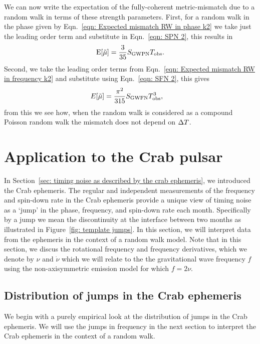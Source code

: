 \documentclass[../full_thesis/full_thesis.tex]{subfiles}
\begin{document}
{We can now write the expectation of the fully-coherent metric-mismatch due to
a random walk in terms of these strength parameters. First, for a random walk
in the phase given by Eqn.~\eqref{eqn: Expected mismatch RW in phase k2} we
take just the leading order term and substitute in Eqn.~\eqref{eqn: SPN 2},
this results in
\begin{align}
\textrm{E}[\tilde{\mu}] = \frac{3}{35} S_{\textrm{GWPN}} T_{\mathrm{obs}}.
\label{eqn: mu prediction phase}
\end{align}
Second, we take the leading order terms from Eqn.~\eqref{eqn: Expected mismatch RW in
frequency k2} and substitute using Eqn.~\eqref{eqn: SFN 2}, this gives
\begin{align}
E[\tilde{\mu}] & = \frac{\pi^{2}}{315} S_{\textrm{GWFN}} T_{\mathrm{obs}}^{3},
\label{eqn: mu prediction}
\end{align}
from this we see how, when the random walk is considered as a compound Poisson
random walk the mismatch does not depend on $\Delta T$.

\section{Application to the Crab pulsar}
\label{sec: application to the crab}
In Section~\ref{sec: timing noise as described by the crab ephemeris}, we
introduced the Crab ephemeris.  The regular and independent measurements of the
frequency and spin-down rate in the Crab ephemeris provide a unique view of
timing noise as a `jump' in the phase, frequency, and spin-down rate each
month. Specifically by a jump we mean the discontinuity at the interface
between two months as illustrated in Figure~\ref{fig: template jumps}. In this
section, we will interpret data from the ephemeris in the context of a random
walk model. Note that in this section,
we discus the rotational frequency and frequency derivatives, which we denote
by $\nu$ and $\dot{\nu}$ which we will relate to the the gravitational wave
frequency $f$ using the non-axisymmetric emission model for which $f=2\nu$.

\subsection{Distribution of jumps in the Crab ephemeris}
\label{sec: jumps}
\newcommand{\nuddotav}{\ddot{\nu}_{\textrm{av}}}
We begin with a purely empirical look at the distribution of jumps in the
Crab ephemeris. We will use the jumps in frequency in the next section to interpret the
Crab ephemeris in the context of a random walk.

}
\end{document}
